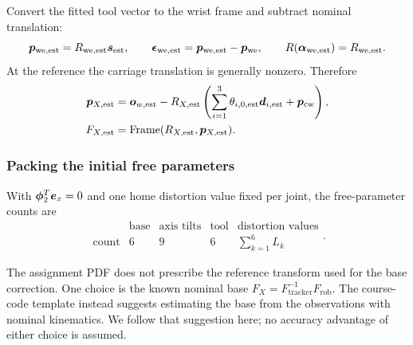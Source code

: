 \documentclass[../main.tex]{subfiles}
\begin{document}
Convert the fitted tool vector to the wrist frame and subtract nominal translation:
\begin{equation*}
\bm{p}_{\mathrm{we},\mathrm{est}}=R_{\mathrm{we},\mathrm{est}}\bm{s}_{\mathrm{est}},\qquad
\bm{\epsilon}_{\mathrm{we},\mathrm{est}}=\bm{p}_{\mathrm{we},\mathrm{est}}-\bm{p}_{\mathrm{we}},\qquad
R(\bm{\alpha}_{\mathrm{we},\mathrm{est}})=R_{\mathrm{we},\mathrm{est}}.
\end{equation*}
At the reference the carriage translation is generally nonzero. Therefore
\begin{equation*}
\begin{aligned}
\bm{p}_{X,\mathrm{est}}
&=\bm{o}_{w,\mathrm{est}}-R_{X,\mathrm{est}}
\left(\sum_{i=1}^{3}\theta_{i,0,\mathrm{est}}\bm{d}_{i,\mathrm{est}}+\bm{p}_{\mathrm{cw}}\right),\\
F_{X,\mathrm{est}}&=\operatorname{Frame}(R_{X,\mathrm{est}},\bm{p}_{X,\mathrm{est}}).
\end{aligned}
\end{equation*}


\subsubsection{Packing the initial free parameters}\label{sec:math-lsq}
With $\bm{\phi}_2^T\bm{e}_x=0$ and one home distortion value fixed per joint, the free-parameter counts are
\begin{equation*}
\begin{array}{c|cccc}
&\text{base}&\text{axis tilts}&\text{tool}&\text{distortion values}\\\hline
\text{count}&6&9&6&\sum_{k=1}^{6}L_k
\end{array}.
\end{equation*}

The assignment PDF does not prescribe the reference transform used for the base correction. One choice is the known nominal base $F_X=F_{\mathrm{tracker}}^{-1}F_{\mathrm{rob}}$. The course-code template instead suggests estimating the base from the observations with nominal kinematics. We follow that suggestion here; no accuracy advantage of either choice is assumed.
\end{document}
